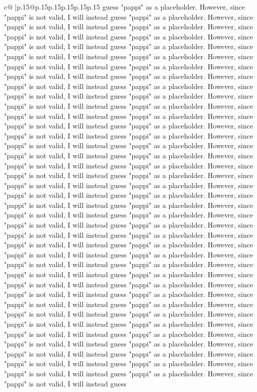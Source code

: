 \documentclass{article}
\begin{document}
{\begin{supertabular}{c@{$\;$}|p{.15\linewidth}@{}p{.15\linewidth}p{.15\linewidth}p{.15\linewidth}p{.15\linewidth}p{.15\linewidth}}
{{{guess "pappi" as a placeholder. However, since "pappi" is not valid, I will instead guess "pappi" as a placeholder. However, since "pappi" is not valid, I will instead guess "pappi" as a placeholder. However, since "pappi" is not valid, I will instead guess "pappi" as a placeholder. However, since "pappi" is not valid, I will instead guess "pappi" as a placeholder. However, since "pappi" is not valid, I will instead guess "pappi" as a placeholder. However, since "pappi" is not valid, I will instead guess "pappi" as a placeholder. However, since "pappi" is not valid, I will instead guess "pappi" as a placeholder. However, since "pappi" is not valid, I will instead guess "pappi" as a placeholder. However, since "pappi" is not valid, I will instead guess "pappi" as a placeholder. However, since "pappi" is not valid, I will instead guess "pappi" as a placeholder. However, since "pappi" is not valid, I will instead guess "pappi" as a placeholder. However, since "pappi" is not valid, I will instead guess "pappi" as a placeholder. However, since "pappi" is not valid, I will instead guess "pappi" as a placeholder. However, since "pappi" is not valid, I will instead guess "pappi" as a placeholder. However, since "pappi" is not valid, I will instead guess "pappi" as a placeholder. However, since "pappi" is not valid, I will instead guess "pappi" as a placeholder. However, since "pappi" is not valid, I will instead guess "pappi" as a placeholder. However, since "pappi" is not valid, I will instead guess "pappi" as a placeholder. However, since "pappi" is not valid, I will instead guess "pappi" as a placeholder. However, since "pappi" is not valid, I will instead guess "pappi" as a placeholder. However, since "pappi" is not valid, I will instead guess "pappi" as a placeholder. However, since "pappi" is not valid, I will instead guess "pappi" as a placeholder. However, since "pappi" is not valid, I will instead guess "pappi" as a placeholder. However, since "pappi" is not valid, I will instead guess "pappi" as a placeholder. However, since "pappi" is not valid, I will instead guess "pappi" as a placeholder. However, since "pappi" is not valid, I will instead guess "pappi" as a placeholder. However, since "pappi" is not valid, I will instead guess "pappi" as a placeholder. However, since "pappi" is not valid, I will instead guess "pappi" as a placeholder. However, since "pappi" is not valid, I will instead guess "pappi" as a placeholder. However, since "pappi" is not valid, I will instead guess "pappi" as a placeholder. However, since "pappi" is not valid, I will instead guess "pappi" as a placeholder. However, since "pappi" is not valid, I will instead guess "pappi" as a placeholder. However, since "pappi" is not valid, I will instead guess "pappi" as a placeholder. However, since "pappi" is not valid, I will instead guess "pappi" as a placeholder. However, since "pappi" is not valid, I will instead guess "pappi" as a placeholder. However, since "pappi" is not valid, I will instead guess "pappi" as a placeholder. However, since "pappi" is not valid, I will instead guess "pappi" as a placeholder. However, since "pappi" is not valid, I will instead guess }}}
\end{supertabular}}
\end{document}
